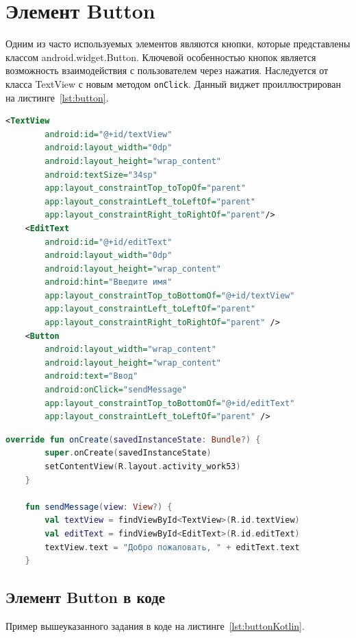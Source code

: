 \section{Элемент Button}
Одним из часто используемых элементов являются кнопки, которые 
представлены классом android.widget.Button. Ключевой особенностью кнопок 
является возможность взаимодействия с пользователем через нажатия. 
Наследуется от класса TextView с новым методом \texttt{onClick}.
Данный виджет проиллюстрирован на листинге~\ref{lst:button}.
\begin{lstlisting}[language=xml, caption=\leftline{buttonXml}, label=lst:button]
<TextView
        android:id="@+id/textView"
        android:layout_width="0dp"
        android:layout_height="wrap_content"
        android:textSize="34sp"
        app:layout_constraintTop_toTopOf="parent"
        app:layout_constraintLeft_toLeftOf="parent"
        app:layout_constraintRight_toRightOf="parent"/>
    <EditText
        android:id="@+id/editText"
        android:layout_width="0dp"
        android:layout_height="wrap_content"
        android:hint="Введите имя"
        app:layout_constraintTop_toBottomOf="@+id/textView"
        app:layout_constraintLeft_toLeftOf="parent"
        app:layout_constraintRight_toRightOf="parent" />
    <Button
        android:layout_width="wrap_content"
        android:layout_height="wrap_content"
        android:text="Ввод"
        android:onClick="sendMessage"
        app:layout_constraintTop_toBottomOf="@+id/editText"
        app:layout_constraintLeft_toLeftOf="parent" />
\end{lstlisting}
\begin{lstlisting}[language=Kotlin, caption=\leftline{buttonXmlKotlin}, label=lst:buttonXmlKotlin]
override fun onCreate(savedInstanceState: Bundle?) {
        super.onCreate(savedInstanceState)
        setContentView(R.layout.activity_work53)
    }

    fun sendMessage(view: View?) {
        val textView = findViewById<TextView>(R.id.textView)
        val editText = findViewById<EditText>(R.id.editText)
        textView.text = "Добро пожаловать, " + editText.text
    }
\end{lstlisting}
\subsection{Элемент Button в коде}
Пример вышеуказанного задания в коде на листинге~\ref{lst:buttonKotlin}.

